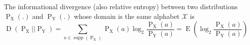 The informational divergence (also relative entropy) between two distributions $\operatorname{P}_{\operatorname{X}}(.)$ and $\operatorname{P}_{\operatorname{Y}}(.)$ whose domain is the same alphabet $\mathcal{X}$ is
$$\operatorname{D}(\operatorname{P}_{\operatorname{X}} || \operatorname{P}_{\operatorname{Y}}) = \sum\limits_{a \in \operatorname{supp}(\operatorname{P}_{\operatorname{X}})} \operatorname{P}_{\operatorname{X}}(a) \log_{2} \frac{\operatorname{P}_{\operatorname{X}}(a)}{\operatorname{P}_{\operatorname{Y}}(a)} = \operatorname{E}(\log_{2} \frac{\operatorname{P}_{\operatorname{X}}(a)}{\operatorname{P}_{\operatorname{Y}}(a)})$$
